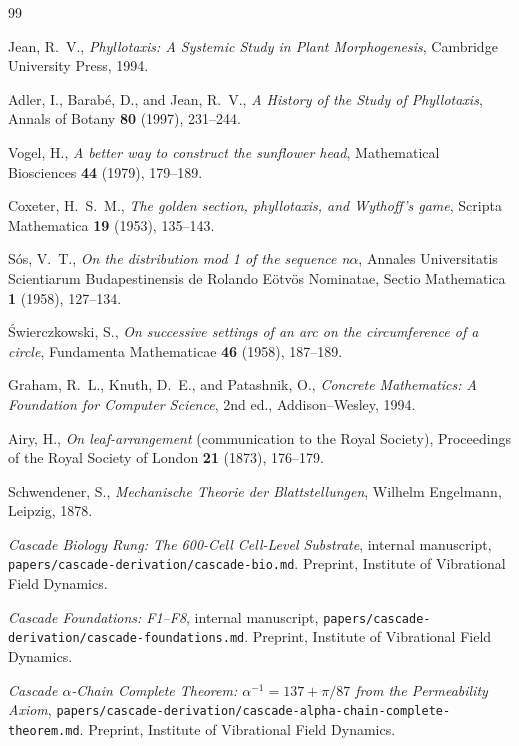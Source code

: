 \documentclass[12pt]{article}
\begin{document}
\begin{thebibliography}{99}

Jean, R.~V., \emph{Phyllotaxis: A Systemic Study in Plant
Morphogenesis}, Cambridge University Press, 1994.

Adler, I., Barab\'e, D., and Jean, R.~V.,
\emph{A History of the Study of Phyllotaxis},
Annals of Botany \textbf{80} (1997), 231--244.

Vogel, H.,
\emph{A better way to construct the sunflower head},
Mathematical Biosciences \textbf{44} (1979), 179--189.

Coxeter, H.~S.~M.,
\emph{The golden section, phyllotaxis, and Wythoff's game},
Scripta Mathematica \textbf{19} (1953), 135--143.

S\'os, V.~T.,
\emph{On the distribution mod 1 of the sequence n$\alpha$},
Annales Universitatis Scientiarum Budapestinensis de Rolando
E\"otv\"os Nominatae, Sectio Mathematica \textbf{1} (1958),
127--134.

\'Swierczkowski, S.,
\emph{On successive settings of an arc on the circumference of a
circle},
Fundamenta Mathematicae \textbf{46} (1958), 187--189.

Graham, R.~L., Knuth, D.~E., and Patashnik, O.,
\emph{Concrete Mathematics: A Foundation for Computer Science},
2nd ed., Addison--Wesley, 1994.

Airy, H.,
\emph{On leaf-arrangement} (communication to the Royal Society),
Proceedings of the Royal Society of London \textbf{21} (1873),
176--179.

Schwendener, S.,
\emph{Mechanische Theorie der Blattstellungen},
Wilhelm Engelmann, Leipzig, 1878.

\emph{Cascade Biology Rung: The 600-Cell Cell-Level Substrate},
internal manuscript,
\texttt{papers/cascade-derivation/cascade-bio.md}. Preprint, Institute
of Vibrational Field Dynamics.

\emph{Cascade Foundations: F1--F8}, internal manuscript,
\texttt{papers/cascade-derivation/cascade-foundations.md}. Preprint,
Institute of Vibrational Field Dynamics.

\emph{Cascade $\alpha$-Chain Complete Theorem: $\alpha^{-1} = 137 +
\pi/87$ from the Permeability Axiom},
\texttt{papers/cascade-derivation/cascade-alpha-chain-complete-theorem.md}.
Preprint, Institute of Vibrational Field Dynamics.


\end{thebibliography}
\end{document}
